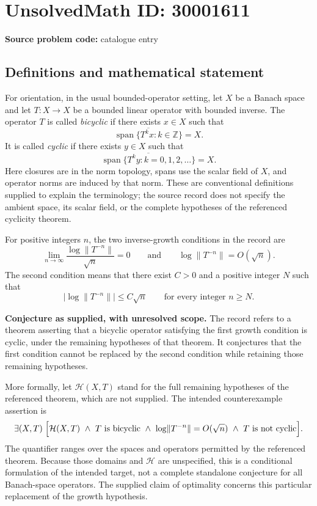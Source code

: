 \documentclass[11pt]{article}
\newcommand{\Z}{\mathbb{Z}}
\begin{document}
\section*{UnsolvedMath ID: 30001611}
\textbf{Source problem code:} catalogue entry
\subsection{Definitions and mathematical statement}
For orientation, in the usual bounded-operator setting, let \(X\) be a Banach space and let \(T\colon X\to X\) be a bounded linear operator with bounded inverse. The operator \(T\) is called \emph{bicyclic} if there exists \(x\in X\) such that
\[
\overline{\operatorname{span}\{T^k x:k\in\Z\}}=X.
\]
It is called \emph{cyclic} if there exists \(y\in X\) such that
\[
\overline{\operatorname{span}\{T^k y:k=0,1,2,\ldots\}}=X.
\]
Here closures are in the norm topology, spans use the scalar field of \(X\), and operator norms are induced by that norm. These are conventional definitions supplied to explain the terminology; the source record does not specify the ambient space, its scalar field, or the complete hypotheses of the referenced cyclicity theorem.

For positive integers \(n\), the two inverse-growth conditions in the record are
\[
\lim_{n\to\infty}\frac{\log\lVert T^{-n}\rVert}{\sqrt n}=0
\qquad\text{and}\qquad
\log\lVert T^{-n}\rVert=O(\sqrt n).
\]
The second condition means that there exist \(C>0\) and a positive integer \(N\) such that
\[
\bigl|\log\lVert T^{-n}\rVert\bigr|\le C\sqrt n
\qquad\text{for every integer }n\ge N.
\]

\textbf{Conjecture as supplied, with unresolved scope.} The record refers to a theorem asserting that a bicyclic operator satisfying the first growth condition is cyclic, under the remaining hypotheses of that theorem. It conjectures that the first condition cannot be replaced by the second condition while retaining those remaining hypotheses.

More formally, let \(\mathcal H(X,T)\) stand for the full remaining hypotheses of the referenced theorem, which are not supplied. The intended counterexample assertion is
\[
\exists (X,T)\;\Bigl[
\mathcal H(X,T)\ \land\ T\text{ is bicyclic}\ \land\
\log\lVert T^{-n}\rVert=O(\sqrt n)
\ \land\ T\text{ is not cyclic}
\Bigr].
\]
The quantifier ranges over the spaces and operators permitted by the referenced theorem. Because those domains and \(\mathcal H\) are unspecified, this is a conditional formulation of the intended target, not a complete standalone conjecture for all Banach-space operators. The supplied claim of optimality concerns this particular replacement of the growth hypothesis.
\end{document}
